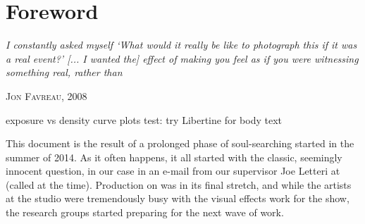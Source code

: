 
\chapter*{Foreword}\label{ch:foreword}

\epigraph{%
	\emph{I constantly asked myself `What would it really be like to photograph
		this if it was a real event?' [... I wanted the] effect of making you feel
		as if you were witnessing something real, rather than }}
{\textsc{Jon Favreau}, 2008}

\ifomit
exposure vs density curve plots
test: try Libertine for body text
\fi

\noindent This document is the result of a prolonged phase of soul-searching 
started in the summer of 2014. As it often happens, it all started with the classic,
seemingly innocent question, in our case in an e-mail from our supervisor Joe Letteri
at  (called  at the time).
Production on \cite{hobbit3} was in its final stretch, and while the artists at the studio
were tremendously busy with the visual effects work for the show, the research groups
started preparing for the next wave of work. 

